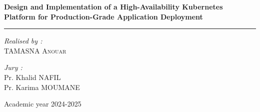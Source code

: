 \documentclass[a4paper,12pt]{report}
\begin{document}
\begin{titlepage}
\begin{center}
\vspace{0.5cm}
\begin{doublespace}
{\LARGE \bfseries Design and Implementation of a High-Availability Kubernetes Platform for Production-Grade Application Deployment}
\vspace{0.5cm}

\textcolor{black}{\rule{\textwidth}{2pt}}

\end{doublespace}
\vspace{2cm}


\begin{minipage}{0.4\textwidth}
\begin{flushleft} \large
\emph{Realised by :}\\[0.4 cm]
TAMASNA \textsc{Anouar}\\
\end{flushleft}
\end{minipage}
\begin{minipage}{0.58\textwidth}
\begin{flushleft} \large
\emph { \hspace*{1.3cm}Jury :} \\[0.4 cm]
\hspace*{1.3cm} Pr. Khalid NAFIL \\ \hspace*{1.3cm} Pr. Karima MOUMANE

\end{flushleft}
\end{minipage}

\vspace{1.5cm}


\vfill

\vspace{1cm}
{\large Academic year 2024-2025}

\end{center}
\end{titlepage}
\end{document}
